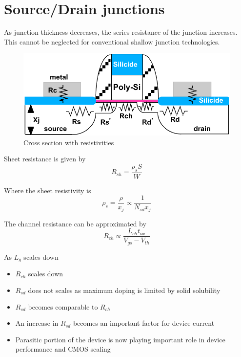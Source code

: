 \section{Source/Drain junctions}
As junction thickness decreases, the series resistance of the junction increases.
This cannot be neglected for conventional shallow junction technologies.

\begin{figure}[H]
	\centering
	\includegraphics[scale=0.5]{junction_dimensioning1.png}
	\caption{Cross section with resistivities}
\end{figure}

Sheet resistance is given by
\begin{equation}
R_{sh}
=
\frac{\rho_s S}{W}
\end{equation}

Where the sheet resistivity is
\begin{equation}
\rho_s
=
\frac{\rho}{x_j}
\propto
\frac{1}{N_{sd} x_j}
\end{equation}

The channel resistance can be approximated by
\begin{equation}
R_{ch}
\propto
\frac{L_{ch} t_{ox}}{V_{gs}-V_{th}}
\end{equation}

As $L_g$ scales down
\begin{itemize}
	\item $R_{ch}$ scales down
	\item $R_{sd}$ does not scales as maximum doping is limited by solid solubility
	\item $R_{sd}$ becomes comparable to $R_{ch}$
	\item An increase in $R_{sd}$ becomes an important factor for device current
	\item Parasitic portion of the device is now playing important role in device performance and CMOS scaling
\end{itemize}
